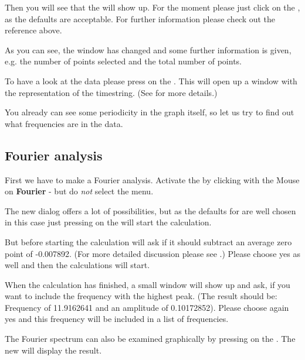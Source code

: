 Then you will see that the  
will show up. For the moment please just click on the ,
as the defaults are acceptable.
For further information please check out the reference above.

As you can see, the window has changed and some further information
is given, e.g. the number of points selected and the total number of
points.

To have a look at the data please press on the .
This will open up a window with the representation of the timestring.
(See  for more details.)

You already can see some periodicity in the graph itself, so 
let us try to find out what frequencies are in the data.

\subsection{Fourier analysis}
First we have to make a Fourier analysis.
Activate the  by clicking
with the Mouse on {\bf Fourier} - but do {\it not} select the menu.

The new dialog offers a lot of possibilities, but as the defaults
for \period are well chosen in this case just pressing on the
 will start the calculation.

But before starting the calculation \period will ask if it should
subtract an average zero point of -0.007892. 
(For more detailed discussion please see 
.)
Please choose yes as well and then the calculations will start.

When the calculation has finished, a small window will show up and ask, 
if you want to include the frequency with the highest peak. 
(The result should be: 
Frequency of 11.9162641 
and an amplitude of 0.10172852).
Please choose again yes and this frequency will be included 
in a list of frequencies.

The Fourier spectrum can also be examined graphically by pressing on the
.
The new  will display the result.


